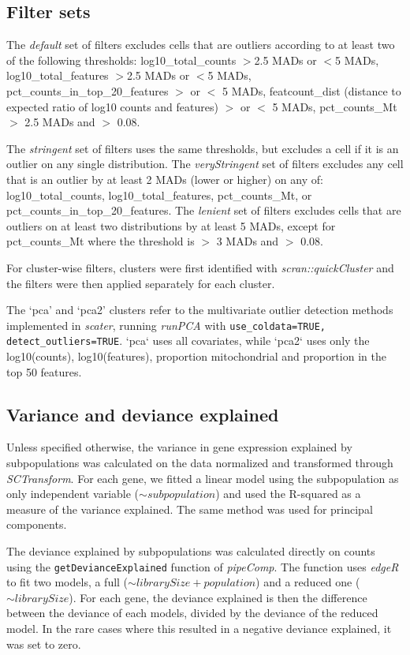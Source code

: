 \documentclass{bmcart}
\begin{document}
\subsection*{Filter sets}
The \textit{default} set of filters excludes cells that are outliers according to at least two of the following thresholds: log10\_total\_counts $>$2.5 MADs or $<$5 MADs, log10\_total\_features $>$2.5 MADs or $<$5 MADs, pct\_counts\_in\_top\_20\_features $>$ or $<$ 5 MADs, featcount\_dist (distance to expected ratio of log10 counts and features) $>$ or $<$ 5 MADs, pct\_counts\_Mt $>$ 2.5 MADs and $>$ 0.08.

The \textit{stringent} set of filters uses the same thresholds, but excludes a cell if it is an outlier on any single distribution. 
The \textit{veryStringent} set of filters excludes any cell that is an outlier by at least 2 MADs (lower or higher) on any of: log10\_total\_counts, log10\_total\_features, pct\_counts\_Mt, or pct\_counts\_in\_top\_20\_features.
The \textit{lenient} set of filters excludes cells that are outliers on at least two distributions by at least 5 MADs, except for pct\_counts\_Mt where the threshold is $>$ 3 MADs and $>$ 0.08.

For cluster-wise filters, clusters were first identified with \textit{scran::quickCluster} and the filters were then applied separately for each cluster. 

The `pca' and `pca2' clusters refer to the multivariate outlier detection methods implemented in \textit{scater}, running \textit{runPCA} with \texttt{use\_coldata=TRUE, detect\_outliers=TRUE}. `pca` uses all covariates, while `pca2` uses only the log10(counts), log10(features), proportion mitochondrial and proportion in the top 50 features.

\subsection*{Variance and deviance explained}

Unless specified otherwise, the variance in gene expression explained by subpopulations was calculated on the data normalized and transformed through \textit{SCTransform}. For each gene, we fitted a linear model using the subpopulation as only independent variable ($\sim subpopulation$) and used the R-squared as a measure of the variance explained. The same method was used for principal components.

The deviance explained by subpopulations was calculated directly on counts using the \linebreak \texttt{getDevianceExplained} function of \textit{pipeComp}. The function uses \textit{edgeR} to fit two models, a full ($\sim librarySize + population$) and a reduced one ($\sim librarySize$). For each gene, the deviance explained is then the difference between the deviance of each models, divided by the deviance of the reduced model. In the rare cases where this resulted in a negative deviance explained, it was set to zero.
\end{document}
